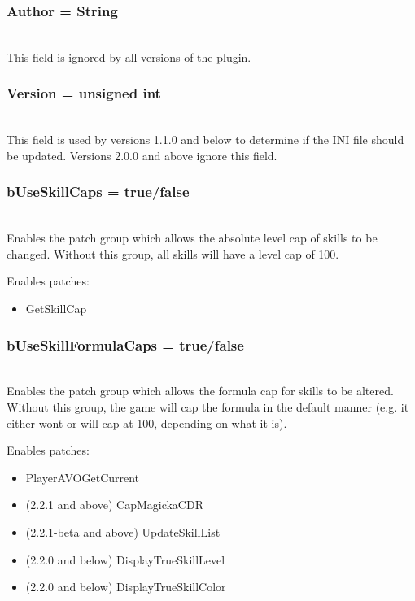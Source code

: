 \documentclass[12pt]{amsart}
\begin{document}
\startblock
\subsubsection{Author = \textlangle String\textrangle}\hfill\\

This field is ignored by all versions of the plugin.
\stopblock

\startblock
\subsubsection{Version = \textlangle unsigned int\textrangle}\hfill\\

This field is used by versions 1.1.0 and below to determine if the INI file
should be updated. Versions 2.0.0 and above ignore this field.
\stopblock

\startblock
\subsubsection{bUseSkillCaps = \textlangle true/false\textrangle}\hfill\\

Enables the patch group which allows the absolute level cap of skills to be
changed. Without this group, all skills will have a level cap of 100.

Enables patches:
\begin{itemize}
    \item GetSkillCap
\end{itemize}
\stopblock

\startblock
\subsubsection{bUseSkillFormulaCaps = \textlangle true/false\textrangle}\hfill\\

Enables the patch group which allows the formula cap for skills to be altered.
Without this group, the game will cap the formula in the default manner
(e.g. it either wont or will cap at 100, depending on what it is).

Enables patches:
\begin{itemize}
    \item PlayerAVOGetCurrent
    \item (2.2.1 and above) CapMagickaCDR
    \item (2.2.1-beta and above) UpdateSkillList
    \item (2.2.0 and below) DisplayTrueSkillLevel
    \item (2.2.0 and below) DisplayTrueSkillColor
\end{itemize}
\stopblock
\end{document}
